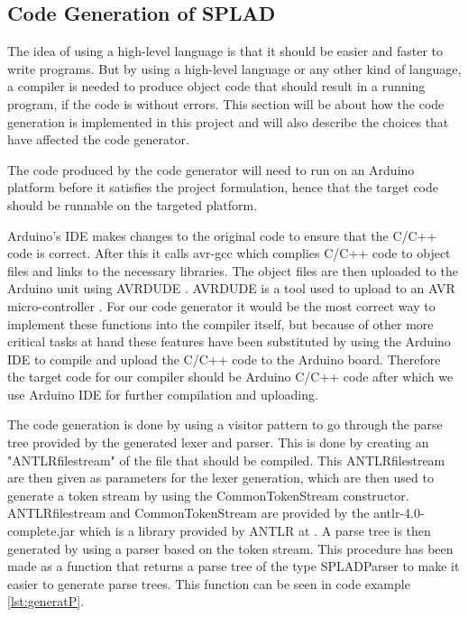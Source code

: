 \subsection{Code Generation of SPLAD}
\label{sec:codegeneration}
The idea of using a high-level language is that it should be easier and faster to write programs. But by using a high-level language or any other kind of language, a compiler is needed to produce object code that should result in a running program, if the code is without errors. This section will be about how the code generation is implemented in this project and will also describe the choices that have affected the code generator.

The code produced by the code generator will need to run on an Arduino platform before it satisfies the project formulation, hence that the target code should be runnable on the targeted platform.

Arduino's IDE makes changes to the original code to ensure that the C/C++ code is correct. After this it calls avr-gcc which complies C/C++ code to object files and links to the necessary libraries. The object files are then uploaded to the Arduino unit using AVRDUDE \citep{Buildproc}. AVRDUDE is a tool used to upload to an AVR micro-controller \citep{AVRDUDE}. For our code generator it would be the most correct way to implement these functions into the compiler itself, but because of other more critical tasks at hand these features have been substituted by using the Arduino IDE to compile and upload the C/C++ code to the Arduino board. Therefore the target code for our compiler should be Arduino C/C++ code after which we use Arduino IDE for further compilation and uploading.


The code generation is done by using a visitor pattern to go through the parse tree provided by the generated lexer and parser. This is done by creating an "ANTLRfilestream" of the file that should be compiled. This ANTLRfilestream are then given as parameters for the lexer generation, which are then used to generate a token stream by using the CommonTokenStream constructor. ANTLRfilestream and CommonTokenStream are provided by the antlr-4.0-complete.jar which is a library provided by ANTLR at \citep{DownloadANTLR}. A parse tree is then generated by using a parser based on the token stream. This procedure has been made as a function that returns a parse tree of the type SPLADParser to make it easier to generate parse trees. This function can be seen in code example \ref{lst:generatP}.


